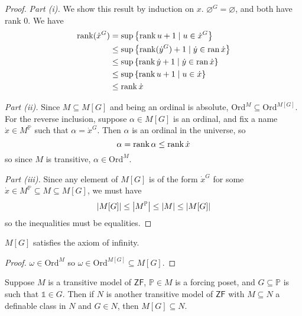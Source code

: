 \begin{proof}
    \emph{Part (i).}
    We show this result by induction on \( x \).
    \( \varnothing^G = \varnothing \), and both have rank \( 0 \).
    We have
    \begin{align*}
        \rank(\dot x^G) &= \sup\qty{\rank u + 1 \mid u \in \dot x^G} \\
        &\leq \sup\qty{\rank(\dot y^G) + 1 \mid \dot y \in \operatorname{ran}\dot x} \\
        &\leq \sup\qty{\rank \dot y + 1 \mid \dot y \in \operatorname{ran}\dot x} \\
        &\leq \sup\qty{\rank u + 1 \mid u \in \dot x} \\
        &\leq \rank \dot x
    \end{align*}

    \emph{Part (ii).}
    Since \( M \subseteq M[G] \) and being an ordinal is absolute, \( \mathrm{Ord}^M \subseteq \mathrm{Ord}^{M[G]} \).
    For the reverse inclusion, suppose \( \alpha \in M[G] \) is an ordinal, and fix a name \( \dot x \in M^{\mathbb P} \) such that \( \alpha = \dot x^G \).
    Then \( \alpha \) is an ordinal in the universe, so
    \[ \alpha = \rank \alpha \leq \rank \dot x \]
    so since \( M \) is transitive, \( \alpha \in \mathrm{Ord}^M \).

    \emph{Part (iii).}
    Since any element of \( M[G] \) is of the form \( \dot x^G \) for some \( \dot x \in M^{\mathbb P} \subseteq M \subseteq M[G] \), we must have
    \[ \abs{M[G]} \leq \abs{M^{\mathbb P}} \leq \abs{M} \leq \abs{M[G]} \]
    so the inequalities must be equalities.
\end{proof}
\begin{corollary}
    \( M[G] \) satisfies the axiom of infinity.
\end{corollary}
\begin{proof}
    \( \omega \in \mathrm{Ord}^M \) so \( \omega \in \mathrm{Ord}^{M[G]} \subseteq M[G] \).
\end{proof}
\begin{lemma}
    Suppose \( M \) is a transitive model of \( \mathsf{ZF} \), \( \mathbb P \in M \) is a forcing poset, and \( G \subseteq \mathbb P \) is such that \( \Bbbone \in G \).
    Then if \( N \) is another transitive model of \( \mathsf{ZF} \) with \( M \subseteq N \) a definable class in \( N \) and \( G \in N \), then \( M[G] \subseteq N \).
\end{lemma}
